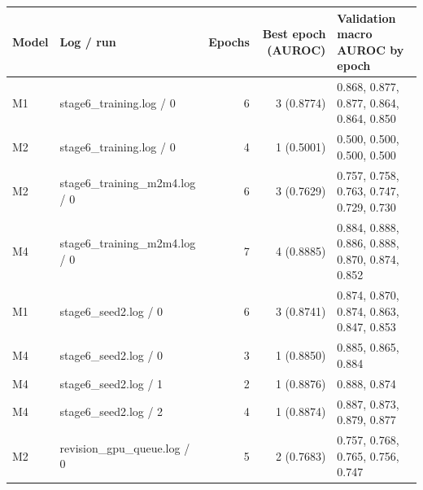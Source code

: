 \begin{tabular}{llrrl}
\toprule
Model & Log / run & Epochs & Best epoch (AUROC) & Validation macro AUROC by epoch\\
\midrule
M1 & stage6\_training.log / 0 & 6 & 3 (0.8774) & 0.868, 0.877, 0.877, 0.864, 0.864, 0.850\\
M2 & stage6\_training.log / 0 & 4 & 1 (0.5001) & 0.500, 0.500, 0.500, 0.500\\
M2 & stage6\_training\_m2m4.log / 0 & 6 & 3 (0.7629) & 0.757, 0.758, 0.763, 0.747, 0.729, 0.730\\
M4 & stage6\_training\_m2m4.log / 0 & 7 & 4 (0.8885) & 0.884, 0.888, 0.886, 0.888, 0.870, 0.874, 0.852\\
M1 & stage6\_seed2.log / 0 & 6 & 3 (0.8741) & 0.874, 0.870, 0.874, 0.863, 0.847, 0.853\\
M4 & stage6\_seed2.log / 0 & 3 & 1 (0.8850) & 0.885, 0.865, 0.884\\
M4 & stage6\_seed2.log / 1 & 2 & 1 (0.8876) & 0.888, 0.874\\
M4 & stage6\_seed2.log / 2 & 4 & 1 (0.8874) & 0.887, 0.873, 0.879, 0.877\\
M2 & revision\_gpu\_queue.log / 0 & 5 & 2 (0.7683) & 0.757, 0.768, 0.765, 0.756, 0.747\\
\bottomrule
\end{tabular}
